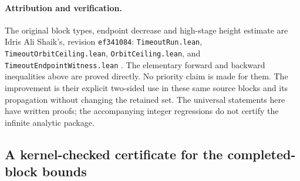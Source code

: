 \paragraph{Attribution and verification.}
The original block types, endpoint decrease and high-stage height estimate
are Idris Ali Shaik's, revision \texttt{ef341084}:
\texttt{TimeoutRun.lean}, \texttt{TimeoutOrbitCeiling.lean},
\texttt{OrbitCeiling.lean}, and \texttt{TimeoutEndpointWitness.lean}
\cite{Shaik2026v324}. The elementary forward and backward inequalities
above are proved directly. No priority claim is made for them.
The improvement is their explicit two-sided use in these same source
blocks and its propagation without changing the retained set.
The universal statements here have written proofs; the accompanying
integer regressions do not certify the infinite analytic package.

\subsection{A kernel-checked certificate for the completed-block bounds}

